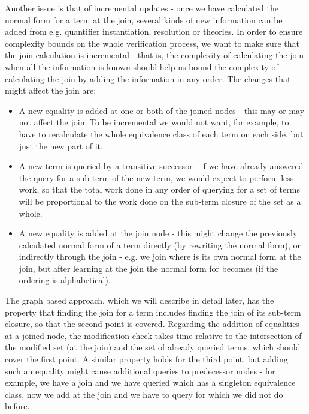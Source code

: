 Another issue is that of incremental updates - once we have calculated the normal form for a term  at the join, several kinds of new information can be added from e.g. quantifier instantiation, resolution or theories. 
In order to ensure complexity bounds on the whole verification process, we want to make sure that the join calculation is incremental - that is, the complexity of calculating the join when all the information is known should help us bound the complexity of calculating the join by adding the information in any order.
The changes that might affect the join are:
\begin{itemize}
	\item A new equality is added at one or both of the joined nodes - this may or may not affect the join. To be incremental we would not want, for example, to have to recalculate the whole equivalence class of each term on each side, but just the new part of it.
	\item A new term is queried by a transitive successor - if we have already answered the query for a sub-term of the new term, we would expect to perform less work, so that the total work done in any order of querying for a set of terms will be proportional to the work done on the sub-term closure of the set as a whole.
	\item A new equality is added at the join node - this might change the previously calculated normal form of a term directly (by rewriting the normal form), or indirectly through the join - e.g. we join  where  is its own normal form at the join, but after learning  at the join the normal form for  becomes  (if the ordering is alphabetical).
\end{itemize}
The graph based approach, which we will describe in detail later, has the property that finding the join for a term includes finding the join of its sub-term closure, so that the second point is covered. 
Regarding the addition of equalities at a joined node, the modification check takes time relative to the intersection of the modified set (at the join) and the set of already queried terms, which should cover the first point.
A similar property holds for the third point, but adding such an equality might cause additional queries to predecessor nodes - for example, we have a join  and we have queried  which has a singleton equivalence class, now we add  at the join and we have to query for  which we did not do before.

